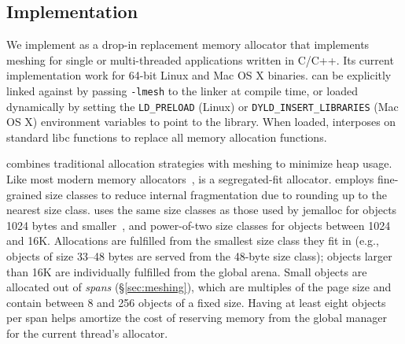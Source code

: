 \subsection{Implementation}
\label{sec:allocator}

We implement \Mesh as a drop-in replacement memory allocator that
implements meshing for single or multi-threaded applications written
in C/C++. Its current implementation work for 64-bit Linux and Mac OS
X binaries. \Mesh can be explicitly linked against by passing
\texttt{-lmesh} to the linker at compile time, or loaded dynamically
by setting the \texttt{LD\_PRELOAD} (Linux) or
\texttt{DYLD\_INSERT\_LIBRARIES} (Mac OS X) environment variables to
point to the \Mesh{} library. When loaded, \Mesh interposes on
standard libc functions to replace all memory allocation functions.

\Mesh combines traditional allocation strategies with meshing to
minimize heap usage.  Like most modern memory
allocators~\cite{Novark:2010:DSH:1866307.1866371,1134000,379232,evans2006scalable,ghemawattcmalloc},
\Mesh is a segregated-fit allocator. \Mesh{} employs fine-grained size
classes to reduce internal fragmentation due to rounding up to the
nearest size class. \Mesh{} uses the same size classes as those
used by jemalloc for objects 1024 bytes and
smaller~\cite{evans2006scalable}, and power-of-two size classes for
objects between 1024 and 16K.  Allocations are fulfilled from the
smallest size class they fit in (e.g., objects of size 33--48 bytes
are served from the 48-byte size class); objects larger than 16K are
individually fulfilled from the global arena.  Small objects are
allocated out of \textit{spans} (\S\ref{sec:meshing}), which are
multiples of the page size and contain between 8 and 256 objects of a
fixed size.  Having at least eight objects per span helps
amortize the cost of reserving memory from the global manager for
the current thread's allocator.

